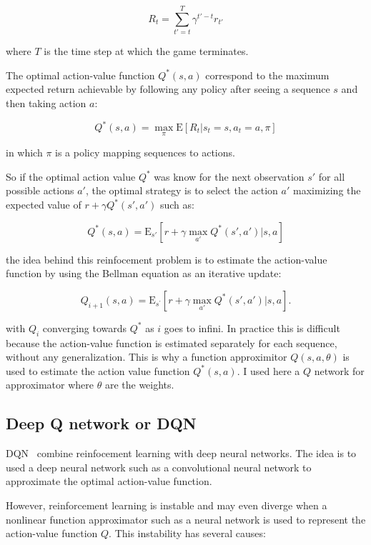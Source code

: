 \documentclass[12pt]{article}
\begin{document}
\begin{equation} 
	R_{t}=\sum_{t'=t}^T \gamma^{t'-t}r_{t'}
\end{equation} 

where $T$ is the time step at which the game terminates.

The optimal action-value function $Q^*(s,a)$ correspond to the maximum expected return achievable by following any policy after seeing a sequence $s$ and then taking action $a$:

\begin{equation} 
 	Q^*(s,a)=\max_{\pi}\mathrm{E}[R_{t}|s_{t}=s,a_{t}=a,\pi]
\end{equation} 

in which $\pi$ is a policy mapping sequences to actions.

So if the optimal action value $Q^*$ was know for the next observation $s'$ for all possible actions $a'$, the optimal strategy is to select the action $a'$ maximizing the expected value of $r + \gamma Q^*(s',a')$ such as:

\begin{equation} 
 	Q^*(s,a)=\mathrm{E}_{s'}[r + \gamma \max_{a'} Q^*(s',a')|s,a]
\end{equation} 

 
the idea behind this reinfocement problem is to estimate the action-value function by using the Bellman equation as an iterative update:

\begin{equation}
	Q_{i+1}(s,a)=\mathrm{E}_{s^{'}} [r + \gamma \max_{a'} Q^{*}(s',a')|s,a].
\end{equation}

with $Q_{i}$ converging towards $Q^*$ as $i$ goes to infini. In practice this is difficult because the action-value function is estimated separately for each sequence, without any generalization. 
This is why a function approximitor $Q(s,a,\theta)$ is used to estimate the action value function $Q^*(s,a)$. 
I used here a $Q$ network for approximator where $\theta$ are the weights.


\subsection*{Deep Q network or DQN}
DQN~\cite{mnih2015humanlevel} combine reinfocement learning with deep neural networks. 
The idea is to used a deep neural network such as a convolutional neural network to approximate the optimal action-value function.
 
However, reinforcement learning is instable and may even diverge when a nonlinear function approximator such as a neural network is used to represent the action-value function $Q$.
This instability has several causes:
 
\end{document}
